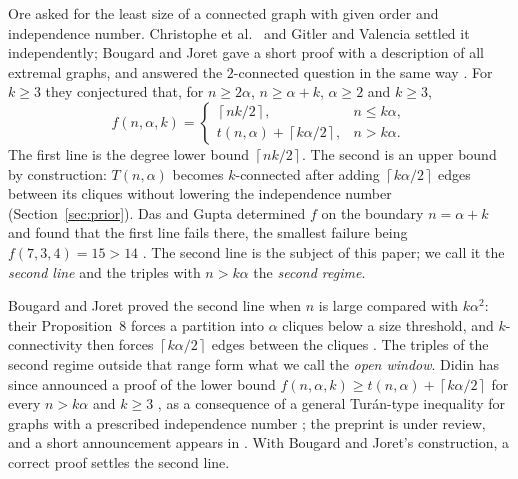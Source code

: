 \documentclass[11pt]{article}
\theoremstyle{definition}
\theoremstyle{remark}
\newcommand{\ceil}[1]{\left\lceil #1\right\rceil}
\begin{document}
Ore asked for the least size of a connected graph with given order and independence number. Christophe et al.\
\cite{Graphedron} and Gitler and Valencia \cite{GitlerValencia} settled it independently; Bougard and Joret gave a
short proof with a description of all extremal graphs, and answered the $2$-connected question in the same way
\cite[Propositions~5 and~6]{BJ}. For $k\ge3$ they conjectured \cite[Conjecture~1]{BJ} that, for $n\ge2\alpha$,
$n\ge\alpha+k$, $\alpha\ge2$ and $k\ge3$,
\begin{equation}\label{eq:conj}
f(n,\alpha,k)=\begin{cases}\ceil{nk/2},& n\le k\alpha,\\[2pt] t(n,\alpha)+\ceil{k\alpha/2},& n>k\alpha.\end{cases}
\end{equation}
The first line is the degree lower bound $\ceil{nk/2}$. The second is an upper bound by construction:
$T(n,\alpha)$ becomes $k$-connected after adding
$\ceil{k\alpha/2}$ edges between its cliques without lowering the independence number (Section~\ref{sec:prior}).
Das and Gupta determined $f$ on the boundary $n=\alpha+k$ and found that the first line fails there, the smallest
failure being $f(7,3,4)=15>14$ \cite{DG}. The second line is the subject of this paper; we call it the \emph{second
line} and the triples with $n>k\alpha$ the \emph{second regime}.

Bougard and Joret proved the second line when $n$ is large compared with $k\alpha^2$: their Proposition~8 forces a
partition into $\alpha$ cliques below a size threshold, and $k$-connectivity then forces $\ceil{k\alpha/2}$ edges
between the cliques \cite[p.~12]{BJ}. The triples of the second regime outside that range form what we call the
\emph{open window}. Didin has since announced a proof of the lower bound $f(n,\alpha,k)\ge t(n,\alpha)+\ceil{k\alpha/2}$
for every $n>k\alpha$ and $k\ge3$ \cite[Theorem~9]{Didin}, as a consequence of a general Tur\'an-type inequality for
graphs with a prescribed independence number \cite[Theorem~3]{Didin}; the preprint is under review, and a short
announcement appears in \cite{DidinMalyshev}. With Bougard and Joret's construction, a correct proof settles the
second line.
\end{document}
